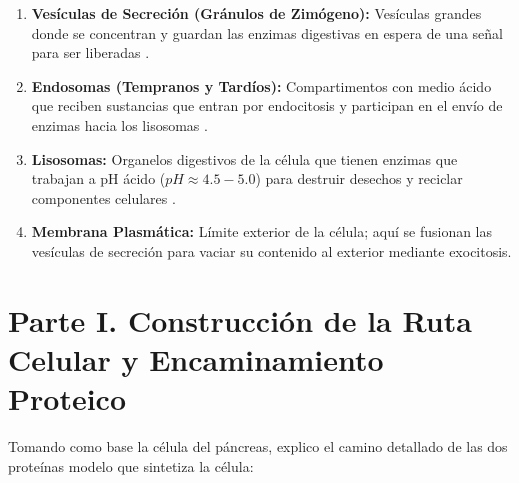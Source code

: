 \documentclass[spanish,letterpaper,oneside]{article}
\begin{document}
\begin{enumerate}
    \item \textbf{Vesículas de Secreción (Gránulos de Zimógeno):} Vesículas grandes donde se concentran y guardan las enzimas digestivas en espera de una señal para ser liberadas \parencite{kierszenbaum2020histologia}.
    \item \textbf{Endosomas (Tempranos y Tardíos):} Compartimentos con medio ácido que reciben sustancias que entran por endocitosis y participan en el envío de enzimas hacia los lisosomas \parencite{alberts2022molecular}.
    \item \textbf{Lisosomas:} Organelos digestivos de la célula que tienen enzimas que trabajan a pH ácido ($pH \approx 4.5-5.0$) para destruir desechos y reciclar componentes celulares \parencite{fortoul2020histologia, lieberman2018marks}.
    \item \textbf{Membrana Plasmática:} Límite exterior de la célula; aquí se fusionan las vesículas de secreción para vaciar su contenido al exterior mediante exocitosis.
\end{enumerate}

\section{Parte I. Construcción de la Ruta Celular y Encaminamiento Proteico}
Tomando como base la célula del páncreas, explico el camino detallado de las dos proteínas modelo que sintetiza la célula:
\end{document}
